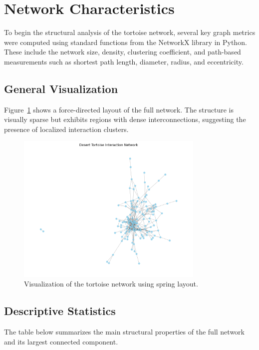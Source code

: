 \documentclass[12pt]{report}
\begin{document}
\chapter*{Network Characteristics}

To begin the structural analysis of the tortoise network, several key graph metrics were computed using standard functions from the NetworkX library in Python. These include the network size, density, clustering coefficient, and path-based measurements such as shortest path length, diameter, radius, and eccentricity.

\section*{General Visualization}
Figure~\ref{fig:network-overview} shows a force-directed layout of the full network. The structure is visually sparse but exhibits regions with dense interconnections, suggesting the presence of localized interaction clusters.

\begin{figure}[h!]
    \centering
    \includegraphics[width=0.8\textwidth]{Images/General Network Visualization.png}
    \caption{Visualization of the tortoise network using spring layout.}
    \label{fig:network-overview}
\end{figure}

\section*{Descriptive Statistics}

The table below summarizes the main structural properties of the full network and its largest connected component.
\end{document}
